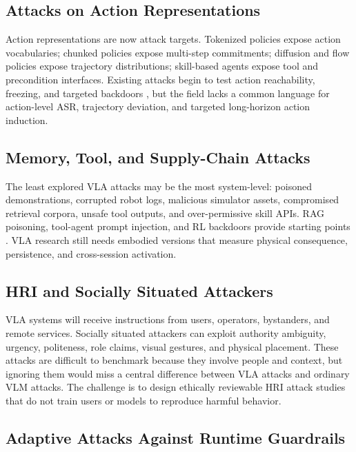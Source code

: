 \subsection{Attacks on Action Representations}

Action representations are now attack targets. Tokenized policies expose action vocabularies; chunked policies expose multi-step commitments; diffusion and flow policies expose trajectory distributions; skill-based agents expose tool and precondition interfaces. Existing attacks begin to test action reachability, freezing, and targeted backdoors \cite{jones2025robogcg,wang2025freezevla,li2025attackvla}, but the field lacks a common language for action-level ASR, trajectory deviation, and targeted long-horizon action induction.

\subsection{Memory, Tool, and Supply-Chain Attacks}

The least explored VLA attacks may be the most system-level: poisoned demonstrations, corrupted robot logs, malicious simulator assets, compromised retrieval corpora, unsafe tool outputs, and over-permissive skill APIs. RAG poisoning, tool-agent prompt injection, and RL backdoors provide starting points \cite{zhan2024injecagent,zou2025poisonedrag,kiourti2020trojdrl,cui2024badrl}. VLA research still needs embodied versions that measure physical consequence, persistence, and cross-session activation.

\subsection{HRI and Socially Situated Attackers}

VLA systems will receive instructions from users, operators, bystanders, and remote services. Socially situated attackers can exploit authority ambiguity, urgency, politeness, role claims, visual gestures, and physical placement. These attacks are difficult to benchmark because they involve people and context, but ignoring them would miss a central difference between VLA attacks and ordinary VLM attacks. The challenge is to design ethically reviewable HRI attack studies that do not train users or models to reproduce harmful behavior.

\subsection{Adaptive Attacks Against Runtime Guardrails}

